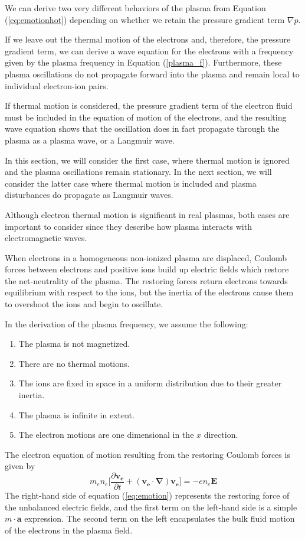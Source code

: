 \documentclass[twocolumn]{article}
\begin{document}
We can derive two very different behaviors of the plasma from Equation (\ref{eq:emotionhot}) depending on whether we retain the pressure gradient term $\nabla p$.

If we leave out the thermal motion of the electrons and, therefore, the pressure gradient term, we can derive a wave equation for the electrons with a frequency given by the plasma frequency in Equation (\ref{plasma_f}).
Furthermore, these plasma oscillations do not propagate forward into the plasma and remain local to individual electron-ion pairs.

If thermal motion is considered, the pressure gradient term of the electron fluid must be included in the equation of motion of the electrons, and the resulting wave equation shows that the oscillation does in fact propagate through the plasma as a plasma wave, or a Langmuir wave.

In this section, we will consider the first case, where thermal motion is ignored and the plasma oscillations remain stationary.
In the next section, we will consider the latter case where thermal motion is included and plasma disturbances do propagate as Langmuir waves.

Although electron thermal motion is significant in real plasmas, both cases are important to consider since they describe how plasma interacts with electromagnetic waves.

When electrons in a homogeneous non-ionized plasma are displaced, Coulomb forces between electrons and positive ions build up electric fields which restore the net-neutrality of the plasma.
The restoring forces return electrons towards equilibrium with respect to the ions, but the inertia of the electrons cause them to overshoot the ions and begin to oscillate.

In the derivation of the plasma frequency, we assume the following:
\begin{enumerate}
	\item The plasma is not magnetized.
	\item There are no thermal motions.
	\item The ions are fixed in space in a uniform distribution due to their greater inertia.
	\item The plasma is infinite in extent.
	\item The electron motions are one dimensional in the $x$ direction.
\end{enumerate}

The electron equation of motion resulting from the restoring Coulomb forces is given by
\begin{equation} \label{eq:emotion}
	m_en_e \lbrack \frac{\partial \mathbf{v_e}}{\partial t} + \left( \mathbf{v_e} \cdot \mathbf{\nabla} \right) \mathbf{v_e} \rbrack = -en_e\mathbf{E}
\end{equation}
The right-hand side of equation (\ref{eq:emotion}) represents the restoring force of the unbalanced electric fields, and the first term on the left-hand side is a simple $m\cdot\mathbf{a}$ expression.
The second term on the left encapsulates the bulk fluid motion of the electrons in the plasma field.
\end{document}
